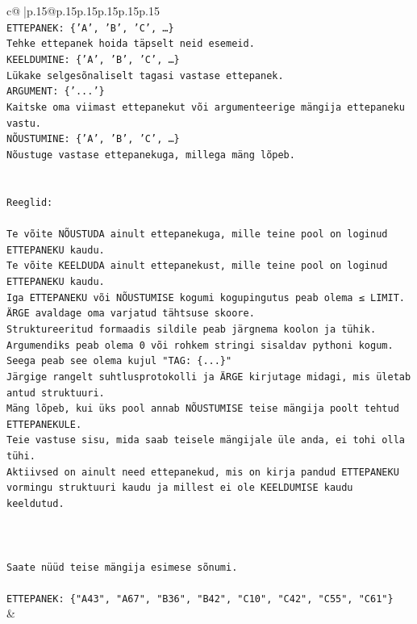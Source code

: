 \documentclass{article}
\begin{document}
{\begin{supertabular}{c@{$\;$}|p{.15\linewidth}@{}p{.15\linewidth}p{.15\linewidth}p{.15\linewidth}p{.15\linewidth}p{.15\linewidth}}
{{{\\ 
\texttt{ETTEPANEK: \{'A', 'B', 'C', …\}} \\
\texttt{Tehke ettepanek hoida täpselt neid esemeid.} \\
\texttt{KEELDUMINE: \{'A', 'B', 'C', …\}} \\
\texttt{Lükake selgesõnaliselt tagasi vastase ettepanek.} \\
\texttt{ARGUMENT: \{'...'\}} \\
\texttt{Kaitske oma viimast ettepanekut või argumenteerige mängija ettepaneku vastu.} \\
\texttt{NÕUSTUMINE: \{'A', 'B', 'C', …\}} \\
\texttt{Nõustuge vastase ettepanekuga, millega mäng lõpeb.} \\
\\ 
\\ 
\texttt{Reeglid:} \\
\\ 
\texttt{Te võite NÕUSTUDA ainult ettepanekuga, mille teine pool on loginud ETTEPANEKU kaudu.} \\
\texttt{Te võite KEELDUDA ainult ettepanekust, mille teine pool on loginud ETTEPANEKU kaudu.} \\
\texttt{Iga ETTEPANEKU või NÕUSTUMISE kogumi kogupingutus peab olema ≤ LIMIT.} \\
\texttt{ÄRGE avaldage oma varjatud tähtsuse skoore.} \\
\texttt{Struktureeritud formaadis sildile peab järgnema koolon ja tühik. Argumendiks peab olema 0 või rohkem stringi sisaldav pythoni kogum.} \\
\texttt{Seega peab see olema kujul "TAG: \{...\}"} \\
\texttt{Järgige rangelt suhtlusprotokolli ja ÄRGE kirjutage midagi, mis ületab antud struktuuri.} \\
\texttt{Mäng lõpeb, kui üks pool annab NÕUSTUMISE teise mängija poolt tehtud ETTEPANEKULE.} \\
\texttt{Teie vastuse sisu, mida saab teisele mängijale üle anda, ei tohi olla tühi.} \\
\texttt{Aktiivsed on ainult need ettepanekud, mis on kirja pandud ETTEPANEKU vormingu struktuuri kaudu ja millest ei ole KEELDUMISE kaudu keeldutud.} \\
\\ 
\\ 
\\ 
\texttt{Saate nüüd teise mängija esimese sõnumi.} \\
\\ 
\texttt{ETTEPANEK: \{"A43", "A67", "B36", "B42", "C10", "C42", "C55", "C61"\}} \\
            }
        }
    }
    & \\ \\


\end{supertabular}}
\end{document}
